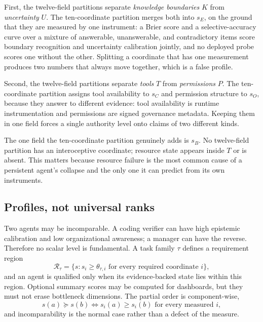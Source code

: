 \documentclass[11pt]{article}
\begin{document}
First, the twelve-field partitions separate \emph{knowledge boundaries} $K$ from \emph{uncertainty} $U$. The ten-coordinate partition merges both into $s_E$, on the ground that they are measured by one instrument: a Brier score and a selective-accuracy curve over a mixture of answerable, unanswerable, and contradictory items score boundary recognition and uncertainty calibration jointly, and no deployed probe scores one without the other. Splitting a coordinate that has one measurement produces two numbers that always move together, which is a false profile.

Second, the twelve-field partitions separate \emph{tools} $T$ from \emph{permissions} $P$. The ten-coordinate partition assigns tool availability to $s_C$ and permission structure to $s_O$, because they answer to different evidence: tool availability is runtime instrumentation and permissions are signed governance metadata. Keeping them in one field forces a single authority level onto claims of two different kinds.

The one field the ten-coordinate partition genuinely adds is $s_B$. No twelve-field partition has an interoceptive coordinate; resource state appears inside $T$ or is absent. This matters because resource failure is the most common cause of a persistent agent's collapse and the only one it can predict from its own instruments.

\subsection{Profiles, not universal ranks}
\label{sec:profiles}
Two agents may be incomparable. A coding verifier can have high epistemic calibration and low organizational awareness; a manager can have the reverse. Therefore no scalar level is fundamental. A task family $\tau$ defines a requirement region
\begin{equation}
\mathcal{R}_\tau = \{s : s_i \ge \theta_{\tau,i} \text{ for every required coordinate } i\},
\label{eq:region}
\end{equation}
and an agent is qualified only when its evidence-backed state lies within this region. Optional summary scores may be computed for dashboards, but they must not erase bottleneck dimensions. The partial order is component-wise,
\begin{equation}
s(a) \succeq s(b) \iff s_i(a) \ge s_i(b) \text{ for every measured } i,
\label{eq:order}
\end{equation}
and incomparability is the normal case rather than a defect of the measure.
\end{document}

